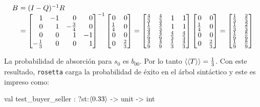 \[
\begin{array}{r@{\ }l}
	B & = (I - Q)^{-1}R \\
	& =
      \left[
	\begin{array}{@{}rrrr@{}}
		1 & -1 & 0 & 0\\
		0 & 1 & -\frac{3}{4} & 0\\
		0 & 0 & 1 & -1\\
		-\frac{1}{3} & 0 & 0  & 1\\
        \end{array}
      \right]^{-1}
      \left[
        \begin{array}{@{}rr@{}}
		0 & 0 \\
		\frac{1}{4} & 0\\
		0 & 0\\
		0 & \frac{2}{3}\\
        \end{array}
      \right]
      =
      \left[
        \begin{array}{@{}rrrr@{}}
		\frac{4}{3} & \frac{4}{3} & 1 & 1\\
		\frac{1}{3} & \frac{4}{3} & 1 & 1\\
		\frac{4}{9} & \frac{4}{9} & \frac{4}{3} & \frac{4}{3}\\
		\frac{4}{9} & \frac{4}{9} & \frac{1}{3} & \frac{4}{3}\\
        \end{array}
      \right]
      \left[
        \begin{array}{@{}rr@{}}
		0 & 0 \\
		\frac{1}{4} & 0\\
		0 & 0\\
		0 & \frac{2}{3}\\
        \end{array}
      \right]
      =
      \left[
        \begin{array}{@{}rr@{}}
		\frac{1}{3} & \frac{2}{3} \\
		\frac{1}{3} & \frac{2}{3} \\
		\frac{1}{9} & \frac{8}{9} \\
		\frac{1}{9} & \frac{8}{9} \\
        \end{array}
      \right]
\end{array}
\]

La probabilidad de absorción para $s_0$ es $b_{00}$. Por lo tanto $\psfun{T} =
\frac{1}{3}$. Con este resultado, \texttt{rosetta} carga la probabilidad de
éxito en el árbol sintáctico y este es impreso como:


\begin{table}[htb]
	\begin{OCamlD}
        val test_buyer_seller : ?st:$\ClosedSessionType[0.33]$ -> unit -> int
	\end{OCamlD}
\end{table}
